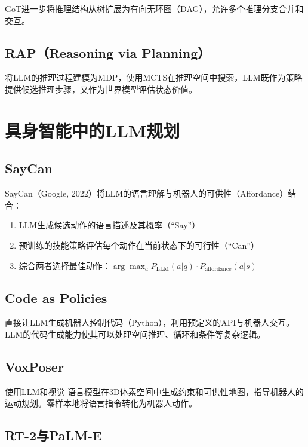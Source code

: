 GoT进一步将推理结构从树扩展为有向无环图（DAG），允许多个推理分支合并和交互。

\subsection{RAP（Reasoning via Planning）\self}

将LLM的推理过程建模为MDP，使用MCTS在推理空间中搜索，LLM既作为策略提供候选推理步骤，又作为世界模型评估状态价值。

\section{具身智能中的LLM规划 \self}

\subsection{SayCan}

\begin{algbox}[title={\textbf{SayCan：LLM + 可供性}}]
SayCan（Google, 2022）将LLM的语言理解与机器人的可供性（Affordance）结合：
\begin{enumerate}
  \item LLM生成候选动作的语言描述及其概率（``Say''）
  \item 预训练的技能策略评估每个动作在当前状态下的可行性（``Can''）
  \item 综合两者选择最佳动作：$\arg\max_a P_{\mathrm{LLM}}(a|q) \cdot P_{\mathrm{affordance}}(a|s)$
\end{enumerate}
\end{algbox}

\subsection{Code as Policies}

直接让LLM生成机器人控制代码（Python），利用预定义的API与机器人交互。LLM的代码生成能力使其可以处理空间推理、循环和条件等复杂逻辑。

\subsection{VoxPoser \self}

使用LLM和视觉-语言模型在3D体素空间中生成约束和可供性地图，指导机器人的运动规划。零样本地将语言指令转化为机器人动作。

\subsection{RT-2与PaLM-E \self}

